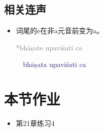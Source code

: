 \documentclass[17pt]{beamer}
\newcommand{\reconstruction}[1]{\textcolor{gray}{*#1}}
\newcommand{\fullsentence}[1]{\textcolor{MidnightBlue}{#1}}
\begin{document}
\subsection{相关连声}
\begin{frame}{\insertsubsection }
  \begin{itemize}
    \item  词尾的e在非a元音前变为a。

    \reconstruction{bhāṣate upaviśati ca}

    \fullsentence{~~bhāṣata upaviśati ca}
  \end{itemize}
\end{frame}

\section{本节作业}

\begin{frame}{\insertsection }
  \begin{itemize}
    \item
      第21章练习4
  \end{itemize}
\end{frame}  
\end{document}
